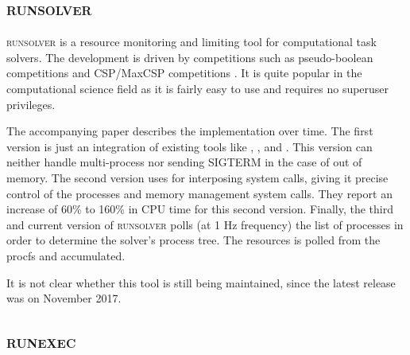 

\subsection{\textsc{runsolver}}
\label{sec:resource.impl.runsolver}

\textsc{runsolver} \citep{rousselControllingSolverExecution2011} is a resource monitoring and limiting tool for computational task solvers.
The development is driven by competitions such as pseudo-boolean competitions and CSP/MaxCSP competitions \citep{rousselControllingSolverExecution2011}.
It is quite popular in the computational science field as it is fairly easy to use and requires no superuser privileges.

The accompanying paper describes the implementation over time.
The first version is just an integration of existing tools like , , and .
This version can neither handle multi-process nor sending SIGTERM in the case of out of memory.
The second version uses  for interposing system calls, giving it precise control of the processes and memory management system calls.
They report an increase of 60\% to 160\% in CPU time for this second version.
Finally, the third and current version of \textsc{runsolver} polls (at 1 Hz frequency) the list of processes in order to determine the solver's process tree.
The resources is polled from the procfs and accumulated.

It is not clear whether this tool is still being maintained, since the latest release was on November 2017.


\subsection{\textsc{runexec}}

